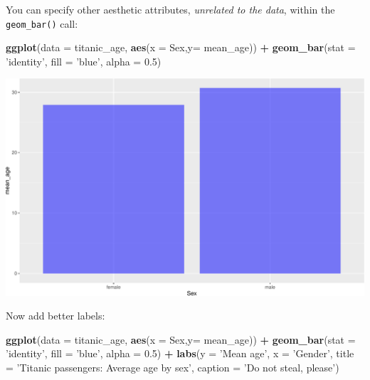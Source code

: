 \documentclass[]{book}
\newenvironment{Shaded}{\begin{snugshade}}{\end{snugshade}}
\newcommand{\DataTypeTok}[1]{\textcolor[rgb]{0.13,0.29,0.53}{#1}}
\newcommand{\FloatTok}[1]{\textcolor[rgb]{0.00,0.00,0.81}{#1}}
\newcommand{\KeywordTok}[1]{\textcolor[rgb]{0.13,0.29,0.53}{\textbf{#1}}}
\newcommand{\NormalTok}[1]{#1}
\newcommand{\OperatorTok}[1]{\textcolor[rgb]{0.81,0.36,0.00}{\textbf{#1}}}
\newcommand{\StringTok}[1]{\textcolor[rgb]{0.31,0.60,0.02}{#1}}
\begin{document}
You can specify other aesthetic attributes, \emph{unrelated to the data}, within the \texttt{geom\_bar()} call:

\begin{Shaded}
\begin{Highlighting}[]
\KeywordTok{ggplot}\NormalTok{(}\DataTypeTok{data =}\NormalTok{ titanic_age, }
       \KeywordTok{aes}\NormalTok{(}\DataTypeTok{x =}\NormalTok{ Sex,}\DataTypeTok{y=}\NormalTok{ mean_age)) }\OperatorTok{+}\StringTok{ }
\StringTok{  }\KeywordTok{geom_bar}\NormalTok{(}\DataTypeTok{stat =} \StringTok{'identity'}\NormalTok{, }\DataTypeTok{fill =} \StringTok{'blue'}\NormalTok{, }\DataTypeTok{alpha =} \FloatTok{0.5}\NormalTok{) }
\end{Highlighting}
\end{Shaded}

\includegraphics{figures/unnamed-chunk-258-1.pdf}

Now add better labels:

\begin{Shaded}
\begin{Highlighting}[]
\KeywordTok{ggplot}\NormalTok{(}\DataTypeTok{data =}\NormalTok{ titanic_age, }
       \KeywordTok{aes}\NormalTok{(}\DataTypeTok{x =}\NormalTok{ Sex,}\DataTypeTok{y=}\NormalTok{ mean_age)) }\OperatorTok{+}\StringTok{ }
\StringTok{  }\KeywordTok{geom_bar}\NormalTok{(}\DataTypeTok{stat =} \StringTok{'identity'}\NormalTok{, }\DataTypeTok{fill =} \StringTok{'blue'}\NormalTok{, }\DataTypeTok{alpha =} \FloatTok{0.5}\NormalTok{) }\OperatorTok{+}\StringTok{ }
\StringTok{  }\KeywordTok{labs}\NormalTok{(}\DataTypeTok{y =} \StringTok{'Mean age'}\NormalTok{, }
       \DataTypeTok{x =} \StringTok{'Gender'}\NormalTok{,}
       \DataTypeTok{title =} \StringTok{'Titanic passengers: Average age by sex'}\NormalTok{,}
       \DataTypeTok{caption =} \StringTok{'Do not steal, please'}\NormalTok{)}
\end{Highlighting}
\end{Shaded}
\end{document}
